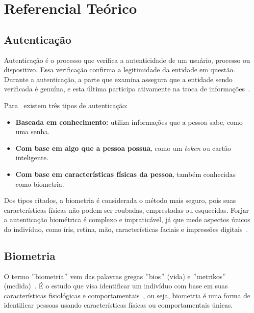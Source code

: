 

\chapter{Referencial Teórico}\label{ch:referencial_teorico}


\section{Autenticação}\label{sec:autenticacao}
Autenticação é o processo que verifica a autenticidade de um usuário, processo ou dispositivo.
Essa verificação confirma a legitimidade da entidade em questão.
Durante a autenticação, a parte que examina assegura que a entidade sendo verificada é genuína, e esta última participa ativamente na troca de informações~\cite{usmonov2021identification}.

Para~\cite{dos2019tecnologias} existem três tipos de autenticação:

\begin{itemize}
    \item \textbf{Baseada em conhecimento:} utiliza informações que a pessoa sabe, como uma senha.
    \item \textbf{Com base em algo que a pessoa possua}, como um \textit{token} ou cartão inteligente.
    \item \textbf{Com base em características físicas da pessoa}, também conhecidas como biometria.
\end{itemize}

Dos tipos citados, a biometria é considerada o método mais seguro, pois suas características físicas não podem ser roubadas, emprestadas ou esquecidas.
Forjar a autenticação biométrica é complexo e impraticável, já que mede aspectos únicos do indivíduo, como íris, retina, mão, características faciais e impressões digitais~\cite{dos2019tecnologias}.


\section{Biometria}\label{sec:biometria}
O termo \("\)biometria\("\) vem das palavras gregas \("\)bios\("\) (vida) e \("\)metrikos\("\) (medida)~\cite{magalhaes2003biometria}.
É o estudo que visa identificar um indivíduo com base em suas características fisiológicas e comportamentais~\cite{handa2019comparative}, ou seja, biometria é uma forma de identificar pessoas usando características físicas ou comportamentais únicas.


